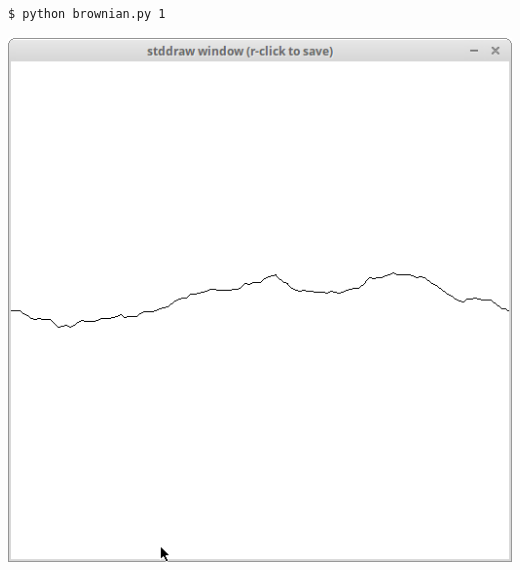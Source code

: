 \documentclass[8pt,a4paper,compress,handout]{beamer}
\begin{document}
\begin{frame}[fragile]
\begin{minipage}{160pt}
\begin{lstlisting}[language={}]
$ python brownian.py 1
\end{lstlisting}
\end{minipage}%
\begin{minipage}{140pt}
\hfill \includegraphics[scale=0.15]{figures/brownian1.png}
\end{minipage}

\smallskip


\end{frame}
\end{document}
